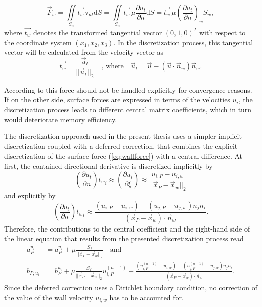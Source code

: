 \begin{equation}
  \label{eq:wallforce}
  \vec{F}_w 
  =  
  \iint\limits_{S_w} \vec{t_w} \, \tau_{nt} \mathrm{d}S
  =
  \iint\limits_{S_w} \vec{t_w} \, \mu \frac{\partial u_t}{\partial n} \mathrm{d}S
  =
  \vec{t_w} \, \mu \left(\frac{\partial u_t}{\partial n}\right)_w S_w,
\end{equation}
where \( \vec{t_w} \) denotes the transformed tangential vector \((0,1,0)^T\) with respect to the coordinate system \((x_1,x_2,x_3)\). In the discretization process, this tangential vector will be calculated from the velocity vector as
\begin{displaymath}
  \vec{t_w} = \frac{\vec{u}_t}{|| \vec{u}_t ||_2} \quad \text{, where} \quad \vec{u}_t = \vec{u} - \left( \vec{u} \cdot \vec{n}_w \right) \vec{n}_w.
\end{displaymath}

According to \cite{ferziger02} this force should not be handled explicitly for convergence reasons. If on the other side, surface forces are expressed in terms of the velocities \(u_i\), the discretization process leads to different central matrix coefficients, which in turn would deteriorate memory efficiency.

The discretization approach used in the present thesis uses a simpler implicit discretization coupled with a deferred correction, that combines the explicit discretization of the surface force (\ref{eq:wallforce}) with a central difference. At first, the contained directional derivative is discretized implicitly by
\begin{displaymath}
  \left(\frac{\partial u_t}{\partial n}\right) {t_w}_i
  \approx
  \left(\frac{\partial u_i}{\partial \xi}\right)
  \approx
  \frac{u_{i,P} - u_{i,w}}{|| \vec{x}_P - \vec{x}_w ||_2}
\end{displaymath}
and explicitly by
\begin{displaymath}
  \left(\frac{\partial u_t}{\partial n}\right) {t_w}_i
  \approx
  \frac{\left(u_{i,P}- u_{i,w} \right) - \left(u_{j,P} - u_{j,w}\right) n_j n_i  }{\left( \vec{x}_P - \vec{x}_w \right) \cdot \vec{n}_w}.
\end{displaymath}
Therefore, the contributions to the central coefficient and the right-hand side of the linear equation that results from the presented discretization process read
\begin{align*}
  a_P^{u_i} &= a_P^{u_i} + \mu \frac{S_f}{|| \vec{x}_P - \vec{x}_w ||_2} \quad \text{and} \\
  b_{P,u_i} &= b_P^{u_i} + \mu \frac{S_f}{|| \vec{x}_P - \vec{x}_w ||_2} u_{i,P}^{(n-1)} + 
  \frac{\left(u_{i,P}^{(n-1)}- u_{i,w} \right) - \left(u_{j,P}^{(n-1)} - u_{j,w}\right) n_j n_i  }{\left( \vec{x}_P - \vec{x}_w \right) \cdot \vec{n}_w}.
\end{align*}
Since the deferred correction uses a Dirichlet boundary condition, no correction of the value of the wall velocity \(u_{i,w}\) has to be accounted for.

